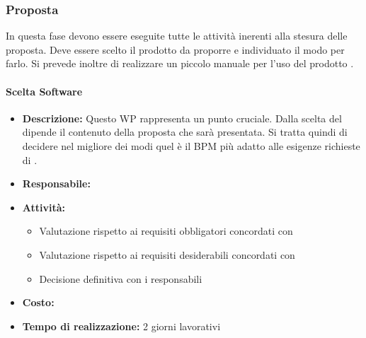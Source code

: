 \subsubsection{Proposta}
In questa fase devono essere eseguite tutte le attività inerenti alla stesura delle proposta. Deve essere scelto il prodotto da proporre e individuato il modo per farlo. Si prevede inoltre di realizzare un piccolo manuale per l'uso del prodotto .

\paragraph{Scelta Software }
\begin{itemize}
\item{\bfseries Descrizione:} Questo WP rappresenta un punto cruciale. Dalla scelta del  dipende il contenuto della proposta che sarà presentata. Si tratta quindi di decidere  nel migliore dei modi quel è il  BPM più adatto alle esigenze richieste di \customer.
\item {\bfseries Responsabile:}
\item  {\bfseries Attività:}
	\begin{itemize}
		\item Valutazione rispetto ai requisiti obbligatori concordati con \customer 
		\item Valutazione rispetto ai requisiti desiderabili concordati con \customer
		\item Decisione definitiva con i responsabili		 
		\end{itemize}
		
\item  {\bfseries Costo:}
\item  {\bfseries Tempo di realizzazione:} 2 giorni lavorativi
\end{itemize}


